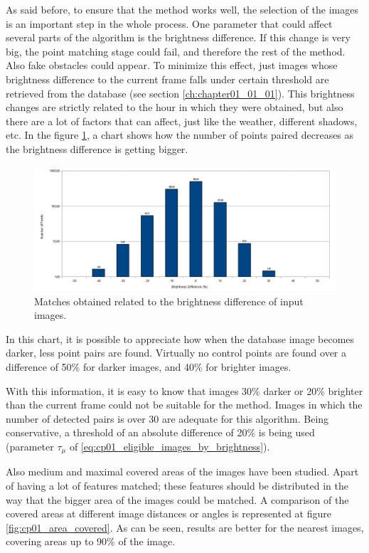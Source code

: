 As said before, to ensure that the method works well, the selection of the images is an important step in the whole process. One parameter that could affect several parts of the algorithm is the brightness difference. If this change is very big, the point matching stage could fail, and therefore the rest of the method. Also fake obstacles could appear. To minimize this effect, just images whose brightness difference to the current frame falls under certain threshold are retrieved from the database (see section \ref{ch:chapter01_01_01}). This brightness changes are strictly related to the hour in which they were obtained, but also there are a lot of factors that can affect, just like the weather, different shadows, etc. In the figure \ref{fig:cp01_brightness_vs_matches}, a chart shows how the number of points paired decreases as the brightness difference is getting bigger.

\begin{figure}[h!]
\centering
\includegraphics[width=\textwidth]{brightness_vs_matches}
\caption{Matches obtained related to the brightness difference of input images.}\label{fig:cp01_brightness_vs_matches}
\end{figure}

In this chart, it is possible to appreciate how when the database image becomes darker, less point pairs are found. Virtually no control points are found over a difference of 50\% for darker images, and 40\% for brighter images.

With this information, it is easy to know that images 30\% darker or 20\% brighter than the current frame could not be suitable for the method. Images in which the number of detected pairs is over 30 are adequate for this algorithm. Being conservative, a threshold of an absolute difference of 20\% is being used (parameter $\tau_{\mu}$ of \ref{eq:cp01_eligible_images_by_brightness}).

Also medium and maximal covered areas of the images have been studied. Apart of having a lot of features matched; these features should be distributed in the way that the bigger area of the images could be matched. A comparison of the covered areas at different image distances or angles is represented at figure \ref{fig:cp01_area_covered}. As can be seen, results are better for the nearest images, covering areas up to 90\% of the image.

